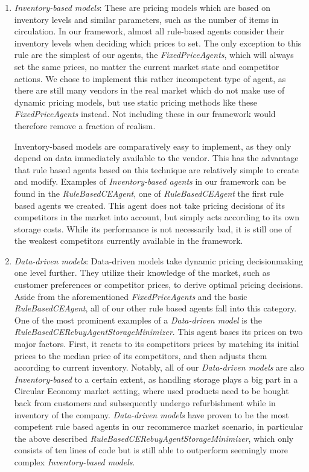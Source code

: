 \begin{enumerate}
	\item \emph{Inventory-based models}: These are pricing models which are based on inventory levels and similar parameters, such as the number of items in circulation. In our framework, almost all rule-based agents consider their inventory levels when deciding which prices to set. The only exception to this rule are the simplest of our agents, the \emph{FixedPriceAgents}, which will always set the same prices, no matter the current market state and competitor actions. We chose to implement this rather incompetent type of agent, as there are still many vendors in the real market which do not make use of dynamic pricing models, but use static pricing methods like these \emph{FixedPriceAgents} instead. Not including these in our framework would therefore remove a fraction of realism.

	Inventory-based models are comparatively easy to implement, as they only depend on data immediately available to the vendor. This has the advantage that rule based agents based on this technique are relatively simple to create and modify. Examples of \emph{Inventory-based agents} in our framework can be found in the \emph{RuleBasedCEAgent}, one of \emph{RuleBasedCEAgent} the first rule based agents we created. This agent does not take pricing decisions of its competitors in the market into account, but simply acts according to its own storage costs. While its performance is not necessarily bad, it is still one of the weakest competitors currently available in the framework. 
	
	\item \emph{Data-driven models}: Data-driven models take dynamic pricing decisionmaking one level further. They utilize their knowledge of the market, such as customer preferences or competitor prices, to derive optimal pricing decisions. Aside from the aforementioned \emph{FixedPriceAgents} and the basic \emph{RuleBasedCEAgent}, all of our other rule based agents fall into this category. One of the most prominent examples of a \emph{Data-driven model} is the \emph{RuleBasedCERebuyAgentStorageMinimizer}. This agent bases its prices on two major factors. First, it reacts to its competitors prices by matching its initial prices to the median price of its competitors, and then adjusts them according to current inventory. Notably, all of our \emph{Data-driven models} are also \emph{Inventory-based} to a certain extent, as handling storage plays a big part in a Circular Economy market setting, where used products need to be bought back from customers and subsequently undergo refurbishment while in inventory of the company. \emph{Data-driven models} have proven to be the most competent rule based agents in our recommerce market scenario, in particular the above described \emph{RuleBasedCERebuyAgentStorageMinimizer}, which only consists of ten lines of code but is still able to outperform seemingly more complex \emph{Inventory-based models}.
	

\end{enumerate}
